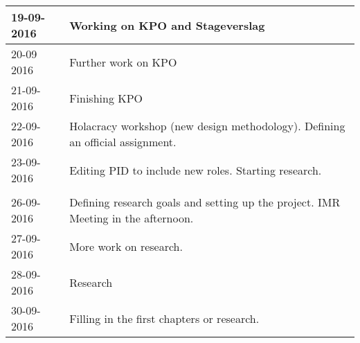 \begin{tabular}{|p{2cm}|p{11cm}|}
	\\ \hline
	
	19-09-2016 &  Working on KPO and Stageverslag \\ \hline
	20-09 2016 &  Further work on KPO \\ \hline
	21-09-2016 &  Finishing KPO \\ \hline
	22-09-2016 &  Holacracy workshop (new design methodology). Defining an official assignment. \\ \hline
	23-09-2016 &  Editing PID to include new roles. Starting research. \\ \hline
	
	\\ \hline
	
	26-09-2016 &  Defining research goals and setting up the project. IMR Meeting in the afternoon.\\ \hline
	27-09-2016 &  More work on research. \\ \hline
	28-09-2016 &  Research \\ \hline
	30-09-2016 &  Filling in the first chapters or research. \\ \hline
	
\end{tabular}

